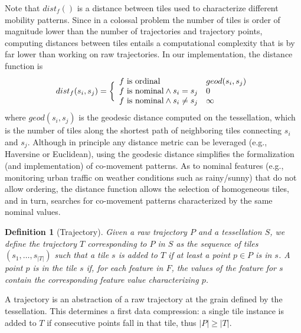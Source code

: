 \documentclass[
]{ceurart}
\newtheorem{definition}{Definition}
\begin{document}
Note that $dist_f()$ is a distance between tiles used to characterize different mobility patterns.
Since in a colossal problem the number of tiles is  order of magnitude lower than the number of trajectories and trajectory points, computing distances between tiles entails a computational complexity that is by far lower than working on raw trajectories.
In our implementation, the distance function is
\begin{equation}
dist_f(s_i,s_j) =
\bigg \{
\begin{array}{ll}
f \textup{ is ordinal}  & geod(s_i,s_j) \\
f \textup{ is nominal} \wedge s_i = s_j & 0 \\
f \textup{ is nominal} \wedge s_i \neq s_j & \infty \\
\end{array}
\end{equation}
%
where $geod(s_i,s_j)$ is the geodesic distance \citep{bouttier2003geodesic} computed on the tessellation, which is the number of tiles along the shortest path of neighboring tiles connecting $s_i$ and $s_j$.
Although in principle any distance metric can be leveraged (e.g., Haversine or Euclidean), using the geodesic distance simplifies the formalization (and implementation) of co-movement patterns.
As to nominal features (e.g., monitoring urban traffic on weather conditions such as rainy/sunny) that do not allow ordering, the distance function allows the selection of homogeneous tiles, and in turn, searches for co-movement patterns characterized by the same nominal values.

\begin{definition}[Trajectory] 
\label{def:tes}
Given a raw trajectory $P$ and a tessellation $S$, we define the \textit{trajectory} $T$ corresponding to $P$ in $S$ as the sequence of tiles $(s_{1}, \ldots, s_{|T|})$ such that a tile $s$ is added to $T$ if at least a point $p \in P$ is in $s$.
A point $p$ \textit{is in} the tile $s$ if, for each feature in $F$, the values of the feature for $s$ contain the corresponding feature value characterizing $p$.
\end{definition}

A trajectory is an abstraction of a raw trajectory at the grain defined by the tessellation.
This determines a first data compression: a single tile instance is added to $T$ if consecutive points fall in that tile, thus $|P| \geq |T|$.
\end{document}
